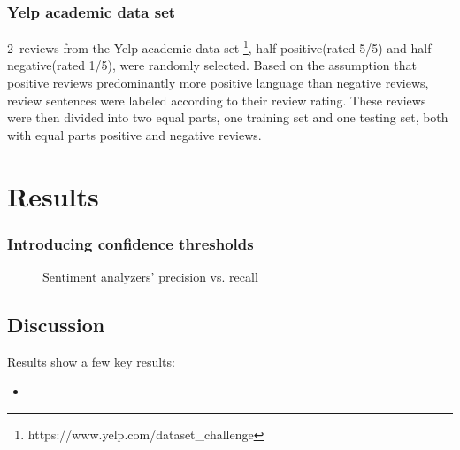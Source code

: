 \documentclass[a4paper,11pt]{kth-mag}
\newcommand{\numClassifiationReviews}{2}
\newcommand{\yelpSentClassifier}{Modified Kneyser-Rey classifier}
\begin{document}
\subsection{Yelp academic data set}
\numClassifiationReviews~reviews from the Yelp academic data set \footnote{https://www.yelp.com/dataset\_challenge}, half positive(rated 5/5) and half negative(rated 1/5), were randomly selected. Based on the assumption that positive reviews predominantly more positive language than negative reviews, review sentences were labeled according to their review rating. These reviews were then divided into two equal parts, one training set and one testing set, both with equal parts positive and negative reviews.


\newpage
\chapter{Results}

\subsection{Introducing confidence thresholds}
\begin{figure}[h]
  \centering
  \caption{Sentiment analyzers' precision vs. recall}
  \label{fig:pr_curve}
\end{figure}

\section{Discussion}

Results show a few key results:
\begin{itemize}
  \item
\end{itemize}
\end{document}
